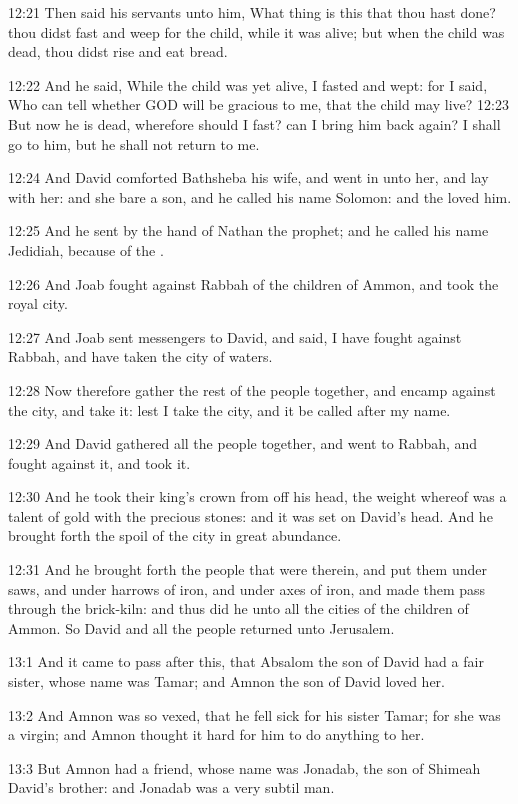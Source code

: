 12:21 Then said his servants unto him, What thing is this that thou hast done? thou didst fast and weep for the child, while it was alive; but when the child was dead, thou didst rise and eat bread.

12:22 And he said, While the child was yet alive, I fasted and wept: for I said, Who can tell whether GOD will be gracious to me, that the child may live?  12:23 But now he is dead, wherefore should I fast?  can I bring him back again? I shall go to him, but he shall not return to me.

12:24 And David comforted Bathsheba his wife, and went in unto her, and lay with her: and she bare a son, and he called his name Solomon: and the \LORD loved him.

12:25 And he sent by the hand of Nathan the prophet; and he called his name Jedidiah, because of the \LORD.

12:26 And Joab fought against Rabbah of the children of Ammon, and took the royal city.

12:27 And Joab sent messengers to David, and said, I have fought against Rabbah, and have taken the city of waters.

12:28 Now therefore gather the rest of the people together, and encamp against the city, and take it: lest I take the city, and it be called after my name.

12:29 And David gathered all the people together, and went to Rabbah, and fought against it, and took it.

12:30 And he took their king's crown from off his head, the weight whereof was a talent of gold with the precious stones: and it was set on David's head. And he brought forth the spoil of the city in great abundance.

12:31 And he brought forth the people that were therein, and put them under saws, and under harrows of iron, and under axes of iron, and made them pass through the brick-kiln: and thus did he unto all the cities of the children of Ammon. So David and all the people returned unto Jerusalem.

13:1 And it came to pass after this, that Absalom the son of David had a fair sister, whose name was Tamar; and Amnon the son of David loved her.

13:2 And Amnon was so vexed, that he fell sick for his sister Tamar; for she was a virgin; and Amnon thought it hard for him to do anything to her.

13:3 But Amnon had a friend, whose name was Jonadab, the son of Shimeah David's brother: and Jonadab was a very subtil man.

